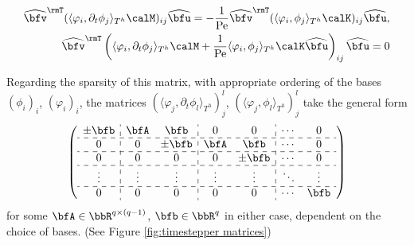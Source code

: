 \begin{example}
        \begin{align}
            \widehat{\bfv}^{\rmT}(\langle\varphi_{i}, \partial_{t}\phi_{j}\rangle_{T^{h}}\calM)_{ij}\widehat{\bfu}  =  - \frac{1}{\rmPe}\widehat{\bfv}^{\rmT}(\langle\varphi_{i}, \phi_{j}\rangle_{T^{h}}\calK)_{ij}\widehat{\bfu},  \\
            \widehat{\bfv}^{\rmT}\left(\langle\varphi_{i}, \partial_{t}\phi_{j}\rangle_{T^{h}}\calM + \frac{1}{\rmPe}\langle\varphi_{i}, \phi_{j}\rangle_{T^{h}}\calK\widehat{\bfu}\right)_{ij}\widehat{\bfu}  =  0
        \end{align}
        
        Regarding the sparsity of this matrix, with appropriate ordering of the bases $(\phi_{i})_{i}$, $(\varphi_{i})_{i}$, the matrices $(\langle\varphi_{j}, \partial_{t}\phi_{l}\rangle_{T^{h}})_{j}^{l}$, $(\langle\varphi_{j}, \phi_{l}\rangle_{T^{h}})_{j}^{l}$ take the general form
        \begin{equation}\label{eqn:timestepper matrices}
            \left(\begin{array}{ c : c c : c c : c c }
                \pm\bfb  &  \bfA    &  \bfb     &  0       &  0        &  \cdots   &  0        \\
                \hdashline
                0        &  0       &  \pm\bfb  &  \bfA    &  \bfb     &  \cdots   &  0        \\
                \hdashline
                0        &  0       &  0        &  0       &  \pm\bfb  &  \cdots   &  0        \\
                \hdashline
                \vdots   &  \vdots  &  \vdots   &  \vdots  &  \vdots   &  \ddots   &  \vdots   \\
                \hdashline
                0        &  0       &  0        &  0       &  0        &  \cdots   &  \bfb     \\
            \end{array}\right)
        \end{equation}
        for some $\bfA  \in  \bbR^{q\times (q - 1)}$, $\bfb  \in  \bbR^{q}$ in either case, dependent on the choice of bases. (See Figure \ref{fig:timestepper matrices}) 


\end{example}
